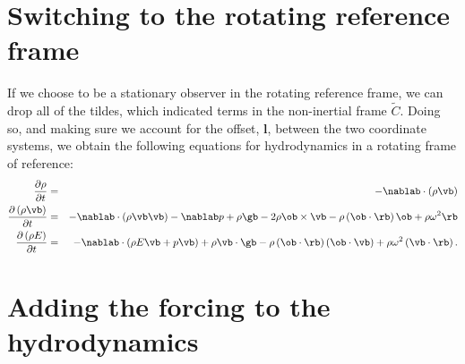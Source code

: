 \section{Switching to the rotating reference frame}
If we choose to be a stationary observer in the rotating reference
frame, we can drop all of the tildes, which indicated terms in the
non-inertial frame \(\widetilde{C}\).  Doing so, and making sure we
account for the offset, \(\boldsymbol{l}\), between the two coordinate systems, we obtain
the following equations for hydrodynamics in a rotating frame of
reference:
  \begin{eqnarray}
    \frac{\partial\rho}{\partial t} &=& -\nablab\cdot\left(\rho\vb\right) \label{eq:cont-rot-switch} \\
    \frac{\partial \left(\rho\vb\right)}{\partial t} &=& -\nablab\cdot\left(\rho\vb\vb\right) - \nablab p + \rho\gb - 2\rho\ob\times\vb - \rho\left(\ob\cdot\rb\right)\ob + \rho\omega^2\rb \label{eq:mom-rot-switch} \\
    \frac{\partial\left(\rho E\right)}{\partial t} &=& -\nablab\cdot\left(\rho E\vb + p\vb\right) + \rho\vb\cdot\gb - \rho\left(\ob\cdot\rb\right)\left(\ob\cdot\vb\right) + \rho\omega^2\left(\vb\cdot\rb\right). \label{eq:etot-rot-switch}
  \end{eqnarray}

\section{Adding the forcing to the hydrodynamics}

